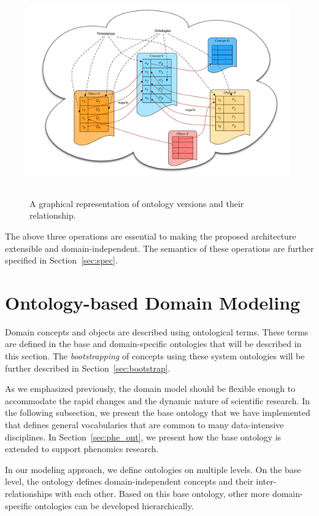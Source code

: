 \documentclass[preprint,12pt]{elsarticle}
\begin{document}
\begin{figure}[htb]
\centering
\includegraphics[height=90mm]{versions.pdf}

\vspace{-8pt} \caption{A graphical representation of ontology versions and their relationship.}\label{fig:versions}
\end{figure}

The above three operations are essential to making the proposed architecture extensible and domain-independent. The semantics of these operations are further specified in Section~\ref{sec:spec}.

\section{Ontology-based Domain Modeling}\label{sec:ont}
Domain concepts and objects are described using ontological terms. These terms are defined in the base and domain-specific ontologies that will be described in this section. The \emph{bootstrapping} of concepts using these system ontologies will be further described in Section~\ref{sec:bootstrap}.

As we emphasized previously, the domain model should be flexible enough to accommodate the rapid changes and the dynamic nature of scientific research. In the following subsection, we present the base ontology that we have implemented that defines general vocabularies that are common to many data-intensive disciplines. In Section~\ref{sec:phe_ont}, we present how the base ontology is extended to support phenomics research.

In our modeling approach, we define ontologies on multiple levels. On the base level, the ontology defines domain-independent concepts and their inter-relationships with each other. Based on this base ontology, other more domain-specific ontologies can be developed hierarchically.
\end{document}
